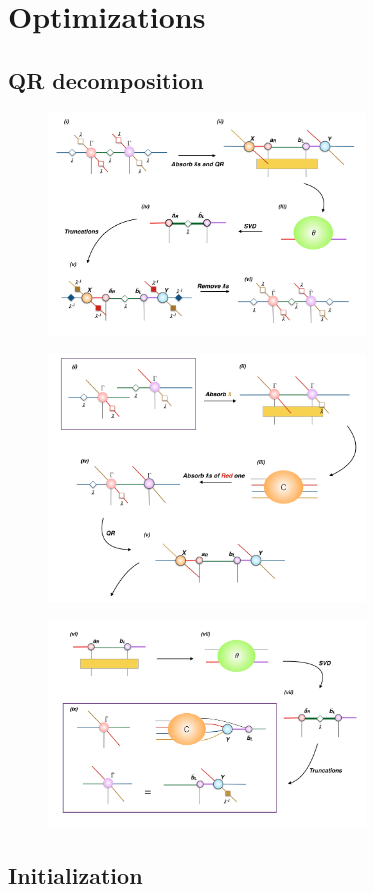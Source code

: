 \section{Optimizations}
\label{2dopt}

\subsection{QR decomposition}
\label{2doptQR}
	\begin{figure}[ht]
	\centering
	\includegraphics[width=0.75\textwidth]{figures/fig317.png}
	\caption[tmp]{}
	\label{fig317}
	\end{figure}

	\begin{figure}[ht]
	\centering
	\includegraphics[width=0.75\textwidth]{figures/fig318.png}
	\caption[tmp]{}
	\label{fig318}
	\end{figure}

	\begin{figure}[ht]
	\centering
	\includegraphics[width=0.75\textwidth]{figures/fig319.png}
	\caption[tmp]{}
	\label{fig319}
	\end{figure}

\subsection{Initialization}
\label{2doptInit}

